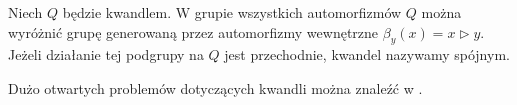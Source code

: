 \begin{definition}
%
    Niech $Q$ będzie kwandlem.
    W grupie wszystkich automorfizmów $Q$ można wyróżnić grupę generowaną przez automorfizmy wewnętrzne $\beta_y(x) = x \triangleright y$.
    Jeżeli działanie tej podgrupy na $Q$ jest przechodnie, kwandel nazywamy spójnym.
\end{definition}

Dużo otwartych problemów dotyczących kwandli można znaleźć w \cite[s. 455-465]{ohtsuki02}.


